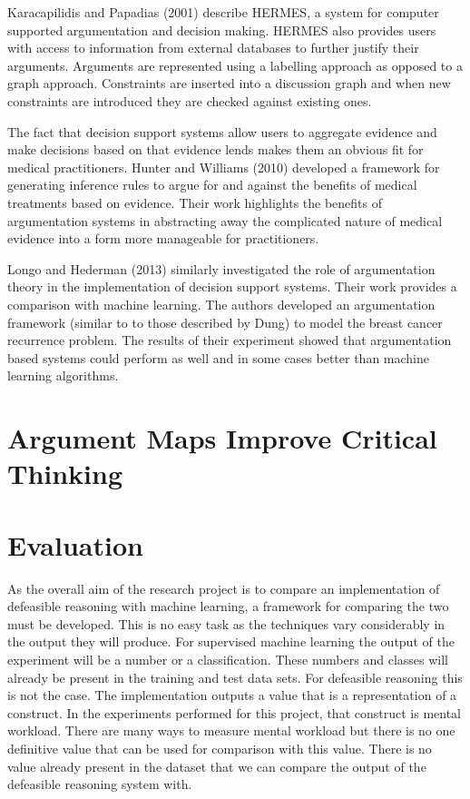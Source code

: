Karacapilidis and Papadias (2001) describe HERMES, a system for computer supported argumentation and decision making. HERMES also provides users with access to information from external databases to further justify their arguments. Arguments are represented using a labelling approach as opposed to a graph approach. Constraints are inserted into a discussion graph and when new constraints are introduced they are checked against existing ones.

The fact that decision support systems allow users to aggregate evidence and make decisions based on that evidence lends makes them an obvious fit for medical practitioners. Hunter and Williams (2010) developed a framework for generating inference rules to argue for and against the benefits of medical treatments based on evidence. Their work highlights the benefits of argumentation systems in abstracting away the complicated nature of medical evidence into a form more manageable for practitioners.

Longo and Hederman (2013) similarly investigated the role of argumentation theory in the implementation of decision support systems. Their work provides a comparison with machine learning. The authors developed an argumentation framework (similar to to those described by Dung) to model the breast cancer recurrence problem. The results of their experiment showed that argumentation based systems could perform as well and in some cases better than machine learning algorithms.


\section{Argument Maps Improve Critical Thinking}



\section{Evaluation}

As the overall aim of the research project is to compare an implementation of defeasible reasoning with machine learning, a framework for comparing the two must be developed. This is no easy task as the techniques vary considerably in the output they will produce. For supervised machine learning the output of the experiment will be a number or a classification. These numbers and classes will already be present in the training and test data sets. For defeasible reasoning this is not the case. The implementation outputs a value that is a representation of a construct. In the experiments performed for this project, that construct is mental workload. There are many ways to measure mental workload but there is no one definitive value that can be used for comparison with this value. There is no value already present in the dataset that we can compare the output of the defeasible reasoning system with.

